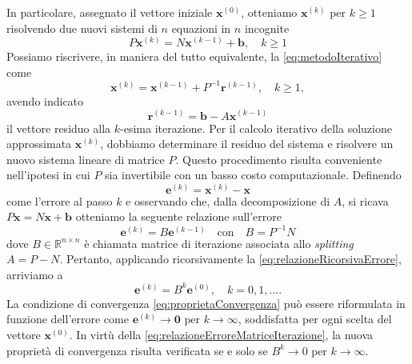 In particolare, assegnato il vettore iniziale $\bm{x}^{(0)}$, otteniamo $\bm{x}^{(k)}$ per $k\ge1$ risolvendo due nuovi sistemi di $n$ equazioni in $n$
incognite
\begin{equation}
    \label{eq:metodoIterativo}
    P\bm{x}^{(k)}=N\bm{x}^{(k-1)} + \bm{b},\quad k\ge1
\end{equation}
Possiamo riscrivere, in maniera del tutto equivalente, la \eqref{eq:metodoIterativo} come
\begin{equation}
    \bm{x}^{(k)}=\bm{x}^{(k-1)} + P^{-1}\bm{r}^{(k-1)},\quad k\ge1,
\end{equation}
avendo indicato
\[
    \bm{r}^{(k-1)}=\bm{b}-A\bm{x}^{(k-1)}
\]
il vettore residuo alla $k$-esima iterazione.\newline
Per il calcolo iterativo della soluzione approssimata  $\bm{x}^{(k)}$, dobbiamo determinare il residuo del sistema e risolvere un nuovo sistema lineare di
matrice $P$.\newline
Questo procedimento risulta conveniente nell'ipotesi in cui $P$ sia invertibile con un basso costo computazionale.\newline
Definendo
\begin{equation}
    \bm{e}^{(k)} = \bm{x}^{(k)}-\bm{x}
\end{equation}
come l'errore al passo $k$ e osservando che, dalla decomposizione di $A$, si ricava $P\bm{x}= N\bm{x}+\bm{b}$ otteniamo la seguente relazione sull'errore
\begin{equation}
    \label{eq:relazioneRicorsivaErrore}
    \bm{e}^{(k)} = B\bm{e}^{(k-1)} \quad \text{con} \quad B = P^{-1}N
\end{equation}
dove $B\in\mathbb{R}^{n \times n}$ \`e chiamata matrice di iterazione associata allo \textit{splitting} $A = P - N$.
Pertanto, applicando ricorsivamente la \eqref{eq:relazioneRicorsivaErrore}, arriviamo a
\begin{equation}
    \label{eq:relazioneErroreMatriceIterazione}
    \bm{e}^{(k)}=B^{k}\bm{e}^{(0)},\quad k = 0, 1, \dots.
\end{equation}
La condizione di convergenza \eqref{eq:proprietaConvergenza} pu\`o essere riformulata in funzione dell'errore come
$\bm{e}^{(k)} \rightarrow \bm{0} \text{ per } k\rightarrow{\infty}$, soddisfatta per ogni scelta del vettore $\bm{x}^{(0)}$.\newline
In virt\`u della \eqref{eq:relazioneErroreMatriceIterazione}, la nuova propriet\`a di convergenza risulta verificata se e solo se ${B}^{k} \rightarrow 0 \text{ per } k\rightarrow{\infty}$.

